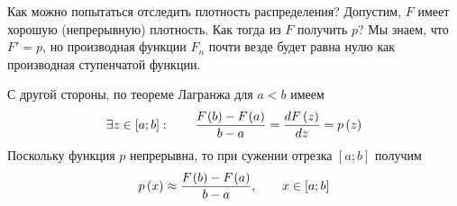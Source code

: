 Как можно попытаться отследить плотность распределения?
Допустим, $F$ имеет хорошую (непрерывную) плотность.
Как тогда из $F$ получить $p$?
Мы знаем, что $F'=p$, но производная функции $F_n$ почти везде будет равна нулю
как производная ступенчатой функции.
\begin{comment}
С другой стороны
\begin{equation*}
  \cdf{b}-\cdf{a}= \int\limits_a^b \pdf{x} dx.
\end{equation*}
Положим $a=x$ и введём $\Delta_x=b-x$
$$\cdf{x+ \Delta_x}-\cdf{x}= \int\limits_x^{x+ \Delta_x} \pdf{y} dy$$
Делим обе части на $\Delta_x$
\begin{equation*}
  \frac{1}{\Delta_x}\cdot \int\limits_x^{x+ \Delta_x} \pdf{y} dy
   = \frac{\cdf{x+ \Delta_x}-\cdf{x}}{\Delta_x}
\end{equation*}
Несложно заметить, что при достаточно малых значениях $\Delta_x$
получаем плотность распределения $\pdf{x}$
\begin{equation*}
  \frac{\Delta\cdf{x}}{\Delta_x} \xrightarrow[]{\Delta_x\to 0}
    \frac{d\cdf{x}}{dx}
  = \pdf{x}
\end{equation*}
Значит, можем заменить $\pdf{x}$ не производной, а такой разностью
\begin{equation*}
  \pdf{x}\approx\frac{\cdf{x+ \Delta_x}-\cdf{x}}{\Delta_x}
\end{equation*}
\end{comment}
С другой стороны, по теореме Лагранжа для $a<b$ имеем
\begin{equation*}
  \exists z\in\left[ a; b \right]:\qquad
  \frac{F_{}\left(b\right) - F_{}\left(a\right)}{b-a} = \frac{dF\left( z \right)}{dz} = p\left(z\right)
\end{equation*}
Поскольку функция $p$ непрерывна, то при сужении отрезка $\left[ a; b \right]$
получим
\begin{equation}\label{eq:LagrangeTheoremConclusion}
  p\left(x\right) \approx \frac{F_{}\left(b\right) - F_{}\left(a\right)}{b-a},
  \qquad x \in \left[ a; b \right]
\end{equation}


